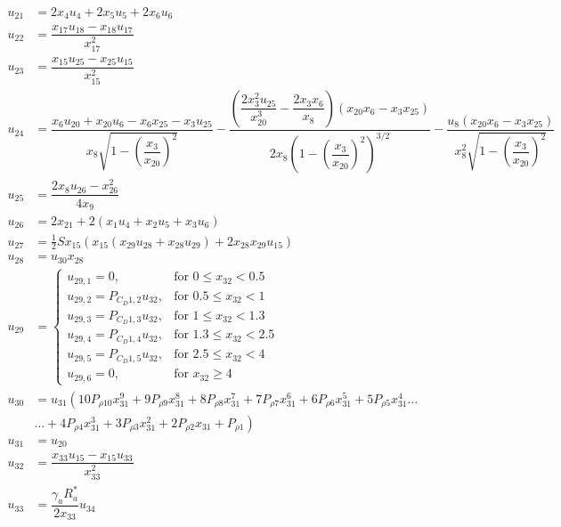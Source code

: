 \begin{equation} \label{eq:unAuxEq2}
\begin{split}
u_{21} &= 2x_{4}u_{4}+2x_{5}u_{5}+2x_{6}u_{6}\\
u_{22} &= \dfrac{x_{17}u_{18}-x_{18}u_{17}}{x_{17}^{2}}\\
u_{23} &= \dfrac{x_{15}u_{25}-x_{25}u_{15}}{x_{15}^{2}}\\
u_{24} &=  \dfrac{x_{6}u_{20}+x_{20}u_{6}-x_{6}x_{25}-x_{3}u_{25}}{x_{8}\sqrt{1-\left(\dfrac{x_{3}}{x_{20}}\right)^{2}}}-\dfrac{\left(\dfrac{2x_{3}^{2}u_{25}}{x_{20}^{3}}-\dfrac{2x_{3}x_{6}}{x_{8}}\right)\left(x_{20}x_{6}-x_{3}x_{25}\right)}{2x_{8}\left(1-\left(\dfrac{x_{3}}{x_{20}}\right)^{2}\right)^{3/2}}-\dfrac{u_{8}\left(x_{20}x_{6}-x_{3}x_{25}\right)}{x_{8}^{2}\sqrt{1-\left(\dfrac{x_{3}}{x_{20}}\right)^{2}}}\\
u_{25} &=  \dfrac{2x_{8}u_{26}-x_{26}^{2}}{4x_{9}}\\
u_{26} &=  2x_{21}+2\left(x_{1}u_{4}+x_{2}u_{5}+x_{3}u_{6}\right)\\
u_{27} &=  \frac{1}{2}Sx_{15}\left(x_{15} \left(x_{29}u_{28}+x_{28}u_{29}\right)+2x_{28}x_{29}u_{15}\right) \\
u_{28} &= u_{30}x_{28} \\
u_{29} &=\begin{cases}
u_{29,1}=0, & \text{for } 0\leq x_{32} < 0.5\\
u_{29,2}=P_{C_{D} 1,2}u_{32}, &  \text{for } 0.5\leq x_{32} < 1 \\
u_{29,3}=P_{C_{D} 1,3}u_{32}, &  \text{for } 1\leq x_{32} < 1.3 \\
u_{29,4}=P_{C_{D} 1,4}u_{32}, &  \text{for } 1.3\leq x_{32} < 2.5 \\
u_{29,5}=P_{C_{D} 1,5}u_{32}, &  \text{for } 2.5\leq x_{32} < 4 \\
u_{29,6}=0, &  \text{for } x_{32} \geq 4 
\end{cases}\\
u_{30} &=u_{31} \left(10 P_{\rho 10}x_{31}^{9}+9 P_{\rho 9}x_{31}^{8}+8 P_{\rho 8}x_{31}^{7}+7 P_{\rho 7}x_{31}^{6}+6 P_{\rho 6}x_{31}^{5}+5 P_{\rho 5}x_{31}^{4}\dots \right. \\
& \left. \dotsc +4 P_{\rho 4}x_{31}^{3}+3 P_{\rho 3}x_{31}^{2}+2 P_{\rho 2}x_{31}+P_{\rho 1}\right) \\
u_{31} &= u_{20}\\
u_{32} &= \dfrac{x_{33}u_{15}-x_{15}u_{33}}{x_{33}^{2}}\\
u_{33} &= \dfrac{\gamma_{a}R_{a}^{*}}{2x_{33}}u_{34} \\

\end{split}
\end{equation}
